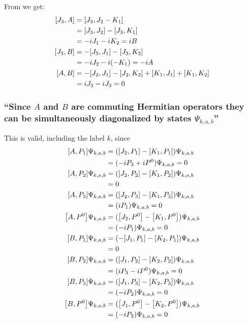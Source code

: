 \subsubsection{ }
From  we get:
\begin{align*} 
	\commutator{J_3}{A}&=\commutator{J_3}{J_2-K_1}\\
	&=\comm{J_3}{J_2}-\comm{J_3}{K_1}\\
	&=-i J_1-iK_2=iB\\
	\commutator{J_3}{B}&=-\comm{J_3}{J_1}-\commutator{J_3}{K_2}\\
	&=-iJ_2-i(-K_1)=-iA\\
	\commutator{A}{B}&=-\commutator{J_2}{J_1}-\commutator{J_2}{K_2}+\commutator{K_1}{J_1}+\commutator{K_1}{K_2}\\
	&=iJ_3-i J_3=0
\end{align*}
\subsubsection{\enquote{Since $A$ and $B$ are commuting Hermitian operators they can be simultaneously diagonalized by states $\Psi_{k,a,b}$} }
This is valid, including the label $k$, since
\begin{align*} 
	\commutator{A}{P_1}\Psi_{k,a,b}&=(\commutator{J_2}{P_1}-\commutator{K_1}{P_1})\Psi_{k,a,b}\\
	&=(-iP_3+iP^0)\Psi_{k,a,b}=0\\
	\commutator{A}{P_2}\Psi_{k,a,b}&=(\commutator{J_2}{P_2}-\commutator{K_1}{P_2})\Psi_{k,a,b}\\
	&=0\\
	\commutator{A}{P_3}\Psi_{k,a,b}&=(\commutator{J_2}{P_3}-\commutator{K_1}{P_3})\Psi_{k,a,b}\\
	&=(iP_1)\Psi_{k,a,b}=0\\
	\commutator{A}{P^0}\Psi_{k,a,b}&=(\commutator{J_2}{P^0}-\commutator{K_1}{P^0})\Psi_{k,a,b}\\
	&=(-iP_1)\Psi_{k,a,b}=0\\
	\commutator{B}{P_1}\Psi_{k,a,b}&=(-\commutator{J_1}{P_1}-\commutator{K_2}{P_1})\Psi_{k,a,b}\\
	&=0\\
	\commutator{B}{P_2}\Psi_{k,a,b}&=(\commutator{J_1}{P_2}-\commutator{K_2}{P_2})\Psi_{k,a,b}\\
	&=(iP_3-iP^0)\Psi_{k,a,b}=0\\
	\commutator{B}{P_3}\Psi_{k,a,b}&=(\commutator{J_1}{P_3}-\commutator{K_2}{P_3})\Psi_{k,a,b}\\
	&=(-iP_2)\Psi_{k,a,b}=0\\
	\commutator{B}{P^0}\Psi_{k,a,b}&=(\commutator{J_1}{P^0}-\commutator{K_2}{P^0})\Psi_{k,a,b}\\
	&=(-iP_2)\Psi_{k,a,b}=0\\
\end{align*}

